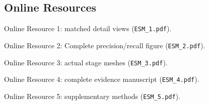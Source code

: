 \documentclass[pdflatex,sn-mathphys-num]{sn-jnl}
\begin{document}
\subsection*{Online Resources}
Online Resource 1: matched detail views (\texttt{ESM\_1.pdf}).

Online Resource 2: Complete precision/recall figure (\texttt{ESM\_2.pdf}).

Online Resource 3: actual stage meshes (\texttt{ESM\_3.pdf}).

Online Resource 4: complete evidence manuscript (\texttt{ESM\_4.pdf}).

Online Resource 5: supplementary methods (\texttt{ESM\_5.pdf}).
\end{document}
